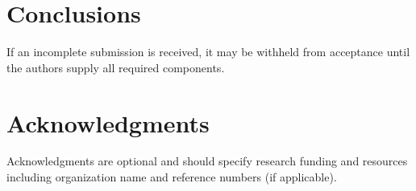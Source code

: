 \documentclass[10pt, letter, twocolumn]{article}
\begin{document}
\section*{Conclusions}

If an incomplete submission is received, it may be withheld from acceptance until the authors supply all required components.

\section*{Acknowledgments}
Acknowledgments are optional and should specify research funding and resources including organization name and reference numbers (if applicable).

\printbibliography %
\end{document}
